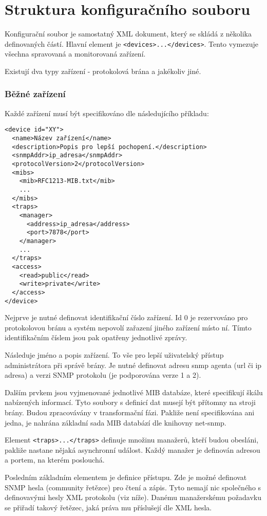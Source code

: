 \chapter{Struktura konfiguračního souboru}
\label{kap_struktura_conf_souboru}
Konfigurační soubor je samostatný XML dokument, který se skládá z několika definovaných částí.
Hlavní element je \verb|<devices>...</devices>|. Tento vymezuje všechna spravovaná a monitorovaná zařízení.

Existují dva typy zařízení - protokolová brána a jakékoliv jiné. 

\subsection*{Běžné zařízení}
Každé zařízení musí být specifikováno dle následujícího příkladu:

\begin{verbatim}
<device id="XY">
  <name>Název zařízení</name>
  <description>Popis pro lepší pochopení.</description>
  <snmpAddr>ip_adresa</snmpAddr>
  <protocolVersion>2</protocolVersion>
  <mibs>
    <mib>RFC1213-MIB.txt</mib>
    ...
  </mibs>
  <traps>
    <manager>
      <address>ip_adresa</address>
      <port>7878</port>
    </manager>
    ...
  </traps>
  <access>
    <read>public</read>
    <write>private</write>
  </access>
</device>
\end{verbatim}

Nejprve je nutné definovat identifikační číslo zařízení. Id 0 je rezervováno pro protokolovou bránu
a systém nepovolí zařazení jiného zařízení místo ní. Tímto identifikačním číslem jsou pak opatřeny
jednotlivé zprávy.

Následuje jméno a popis zařízení. To vše pro lepší uživatelský přístup administrátora při správě brány.
Je nutné definovat adresu snmp agenta (url či ip adresa) a verzi SNMP protokolu (je podporována verze 1 a 2).

Dalším prvkem jsou vyjmenované jednotlivé MIB databáze, které specifikují škálu nabízených informací. Tyto
soubory s definicí dat musejí být přítomny na stroji brány. Budou zpracovávány v transformační fázi. Pakliže
není specifikována ani jedna, je nahrána základní sada MIB databází dle knihovny net-snmp.

Element \verb|<traps>...</traps>| definuje množinu manažerů, kteří budou obesláni, pakliže nastane nějaká
asynchronní událost. Každý manažer je definován adresou a portem, na kterém poslouchá.

Posledním základním elementem je definice přístupu. Zde je možné definovat SNMP hesla (community řetězce)
pro čtení a zápis. Tyto nemají nic společného s definovavými hesly XML protokolu (viz níže). Danému manažerskému
požadavku se přiřadí takový řetězec, jaká práva mu příslušejí dle XML hesla.

